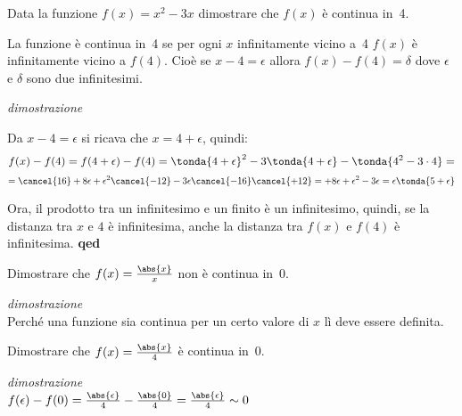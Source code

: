 \begin{esempio}
 Data la funzione \(f(x)=x^2-3x\) dimostrare che \(f(x)\) è continua in~4.
 
 La funzione è continua in~4 se per ogni \(x\) infinitamente vicino a~4 
 \(f(x)\) è infinitamente vicino a \(f(4)\). Cioè se \(x -4=\epsilon\) allora
 \(f(x) -f(4) = \delta\) dove \(\epsilon\) e \(\delta\) sono due infinitesimi.
 
\emph{dimostrazione}

Da \(x-4=\epsilon\) si ricava che \(x=4+\epsilon\), quindi: 
\[f(x) -f(4) = f(4+\epsilon) -f(4) = 
\tonda{4+\epsilon}^2-3\tonda{4+\epsilon}-\tonda{4^2-3\cdot 4}=\]
\[=\cancel{16}+8\epsilon+\epsilon^2\cancel{-12} 
  -3\epsilon\cancel{-16}\cancel{+12} = 
  +8\epsilon+\epsilon^2 -3\epsilon = 
\epsilon \tonda{5 + \epsilon}\]

Ora, il prodotto tra un infinitesimo e un finito è un infinitesimo, quindi, se 
la distanza tra \(x\) e \(4\) è infinitesima, anche la distanza tra 
\(f(x)\) e \(f(4)\) è infinitesima. \hfill \textbf{qed} 
 
\end{esempio}

\begin{esempio}
 Dimostrare che \(f(x)=\frac{\abs{x}}{x}\) non è continua in~0.
 
\emph{dimostrazione}\\
Perché una funzione sia continua per un certo valore di \(x\) lì deve essere 
definita. 
\end{esempio}

\begin{esempio}
 Dimostrare che \(f(x)=\frac{\abs{x}}{4}\) è continua in~0.
 
\emph{dimostrazione}\\
\(f(\epsilon) - f(0) = \frac{\abs{\epsilon}}{4} - \frac{\abs{0}}{4} = 
 \frac{\abs{\epsilon}}{4} \sim 0\)
\end{esempio}

